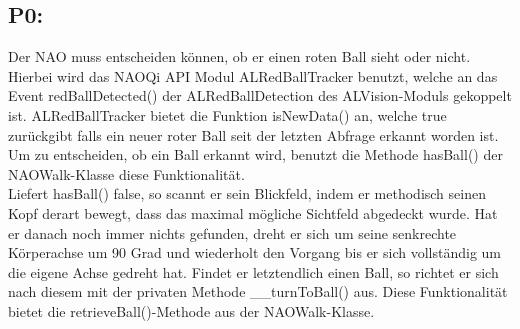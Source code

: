 \subsection*{P0:}
Der NAO muss entscheiden können, ob er einen roten Ball sieht oder nicht. Hierbei wird das NAOQi API Modul ALRedBallTracker benutzt, welche an das Event  redBallDetected() der ALRedBallDetection des ALVision-Moduls gekoppelt ist. ALRedBallTracker bietet die Funktion isNewData() an, welche true zurückgibt falls ein neuer roter Ball seit der letzten Abfrage erkannt worden ist. Um zu entscheiden, ob ein Ball erkannt wird, benutzt die Methode hasBall() der NAOWalk-Klasse diese Funktionalität.
\\
Liefert hasBall() false, so scannt er sein Blickfeld, indem er methodisch seinen Kopf derart bewegt, dass das maximal mögliche Sichtfeld abgedeckt wurde. Hat er danach noch immer nichts gefunden, dreht er sich um seine senkrechte Körperachse um 90 Grad und wiederholt den Vorgang bis er sich vollständig um die eigene Achse gedreht hat. Findet er letztendlich einen Ball, so richtet er sich nach diesem mit der privaten Methode \_\_turnToBall() aus. Diese Funktionalität bietet die retrieveBall()-Methode aus der NAOWalk-Klasse.
\\
\\
